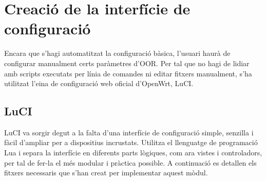 \documentclass[11pt]{article}
\begin{document}
\section{Creació de la interfície de configuració}
Encara que s’hagi automatitzat la configuració bàsica, l’usuari haurà de configurar manualment certs paràmetres d’OOR. Per tal que no hagi de lidiar amb scripts executats per línia de comandes ni editar fitxers manualment, s’ha utilitzat l’eina de configuració web oficial d’OpenWrt, LuCI.
\subsection{LuCI}
LuCI va sorgir degut a la falta d’una interfície de configuració simple, senzilla i fàcil d’ampliar per a dispositius incrustats. Utilitza el llenguatge de programació Lua i separa la interfície en diferents parts lògiques, com ara vistes i controladors, per tal de fer-la el més modular i pràctica possible.
A continuació es detallen els fitxers necessaris que s’han creat per implementar aquest mòdul.
\end{document}
